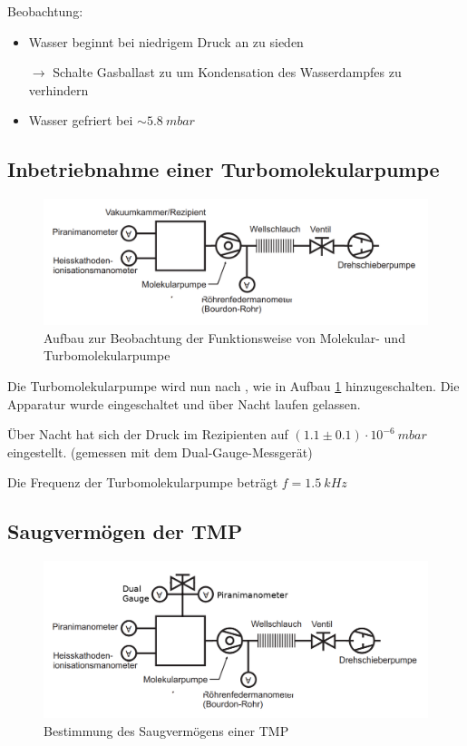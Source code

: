 \documentclass[12pt, a4paper]{scrartcl}
\begin{document}
		Beobachtung:
		\begin{itemize}
			\item Wasser beginnt bei niedrigem Druck an zu sieden
			
			$\rightarrow$ Schalte Gasballast zu um Kondensation des Wasserdampfes zu verhindern			
			
			\item Wasser gefriert bei $\sim 5.8\ mbar$
			
		\end{itemize}

	
	\subsection{Inbetriebnahme einer Turbomolekularpumpe}
	
        \begin{figure}[H]
            \centering
            \includegraphics[width=.55\paperwidth]{aufbau23}
            \caption{Aufbau zur Beobachtung der Funktionsweise von Molekular- und Turbomolekularpumpe}
            \label{fig:anord3}
        \end{figure}
    
    	Die Turbomolekularpumpe wird nun nach \cite{skript}, wie in Aufbau \ref{fig:anord3} hinzugeschalten. Die Apparatur wurde eingeschaltet und über Nacht laufen gelassen.
    	
    	Über Nacht hat sich der Druck im Rezipienten auf 
        $(1.1\pm0.1)\cdot 10^{-6}\ mbar$
        eingestellt. (gemessen mit dem Dual-Gauge-Messgerät)
        
        Die Frequenz der Turbomolekularpumpe beträgt $f = 1.5\ kHz$
    
    
    \subsection{Saugvermögen der TMP}
    
        \begin{figure}[H]
            \centering
            \includegraphics[width=.55\paperwidth]{aufbau24}
            \caption{Bestimmung des Saugvermögens einer TMP}
            \label{fig:anord4}
        \end{figure}
    
\end{document}
